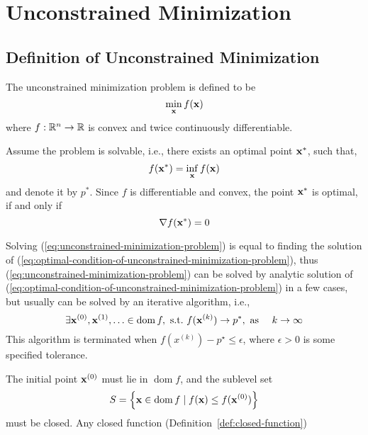 \chapter{Unconstrained Minimization}

\section{Definition of Unconstrained Minimization}

\begin{definition}
	The unconstrained minimization problem is defined to be
	\begin{equation}
		\min_{\mathbf{x}}f(\mathbf{x})
		\label{eq:unconstrained-minimization-problem}
	\end{equation}
	where \(f:\mathbb{R}^n\rightarrow\mathbb{R}\) is convex and twice continuously differentiable.
\end{definition}

Assume the problem is solvable, i.e., there exists an optimal point \(\mathbf{x}^{*}\), such that,
\begin{equation*}
	f(\mathbf{x}^{*})=\inf_{\mathbf{x}}f(\mathbf{x})
\end{equation*}
and denote it by \(p^{*}\). Since \(f\) is differentiable and convex, the point \(\mathbf{x}^{*}\) is optimal, if and only if
\begin{equation}
	\nabla f(\mathbf{x}^{*})=0
	\label{eq:optimal-condition-of-unconstrained-minimization-problem}
\end{equation}

Solving (\ref{eq:unconstrained-minimization-problem}) is equal to finding the solution of (\ref{eq:optimal-condition-of-unconstrained-minimization-problem}), thus (\ref{eq:unconstrained-minimization-problem}) can be solved by analytic solution of (\ref{eq:optimal-condition-of-unconstrained-minimization-problem}) in a few cases, but usually can be solved by an iterative algorithm, i.e.,
\begin{equation*}
	\exists\bfx^{(0)},\bfx^{(1)},\ldots\in\operatorname{dom}f,\ \text{s.t.}\ f(\bfx^{(k)})\rightarrow p^{*},\ \text{as}\ \quad k\rightarrow\infty
\end{equation*}
This algorithm is terminated when \(f\left(x^{(k)}\right)-p^{\star}\leq\epsilon\), where \(\epsilon>0\) is some specified tolerance.

\begin{remark}
	The initial point \(\mathbf{x}^{(0)}\) must lie in \(\operatorname{dom}f\), and the sublevel set
	\begin{equation*}
		S=\left\{\mathbf{x}\in\operatorname{dom}f\mid f(\mathbf{x})\leq f(\mathbf{x}^{(0)})\right\}
	\end{equation*}
	must be closed. Any closed function (Definition~\ref{def:closed-function})
\end{remark}

